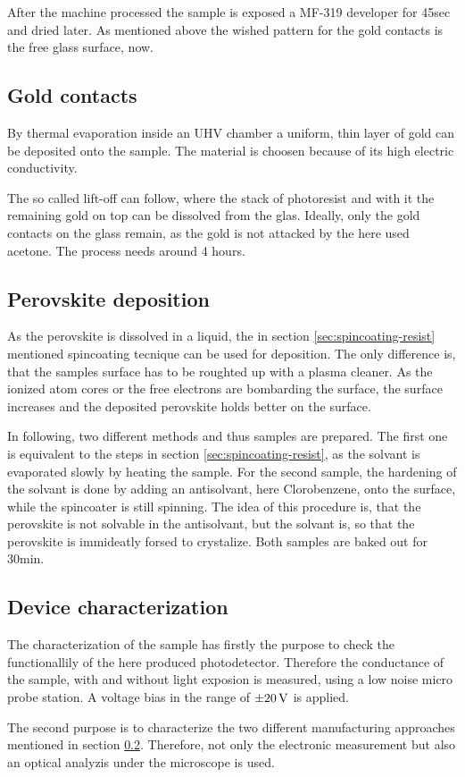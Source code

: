 After the machine processed the sample is exposed a MF-319 developer for 45sec and dried later.
As mentioned above the wished pattern for the gold contacts is the free glass surface, now.

\subsection{Gold contacts}
\label{sec:evaporation}

By thermal evaporation inside an UHV chamber a uniform, thin layer of gold can be deposited onto the sample.
The material is choosen because of its high electric conductivity.

The so called lift-off can follow, where the stack of photoresist and with it the remaining gold on top can be dissolved from the glas. 
Ideally, only the gold contacts on the glass remain, as the gold is not attacked by the here used acetone.
The process needs around 4 hours.

\subsection{Perovskite deposition}
\label{sec:perovskite}

As the perovskite is dissolved in a liquid, the in section \ref{sec:spincoating-resist} mentioned spincoating tecnique can be used for deposition.
The only difference is, that the samples surface has to be roughted up with a plasma cleaner.
As the ionized atom cores or the free electrons are bombarding the surface, the surface increases and the deposited perovskite holds better on the surface.

In following, two different methods and thus samples are prepared. 
The first one is equivalent to the steps in section \ref{sec:spincoating-resist}, as the solvant is evaporated slowly by heating the sample.
For the second sample, the hardening of the solvant is done by adding an antisolvant, here Clorobenzene, onto the surface, while the spincoater is still spinning.
The idea of this procedure is, that the perovskite is not solvable in the antisolvant, but the solvant is, so that the perovskite is immideatly forsed to crystalize.
Both samples are baked out for 30min.

\subsection{Device characterization}
\label{sec:charact-intro}

The characterization of the sample has firstly the purpose to check the functionallily of the here produced photodetector.
Therefore the conductance of the sample, with and without light exposion is measured, using a low noise micro probe station.
A voltage bias in the range of $\SI{\pm 20}{\V }$ is applied.

The second purpose is to characterize the two different manufacturing approaches mentioned in section \ref{sec:perovskite}.
Therefore, not only the electronic measurement but also an optical analyzis under the microscope is used.





